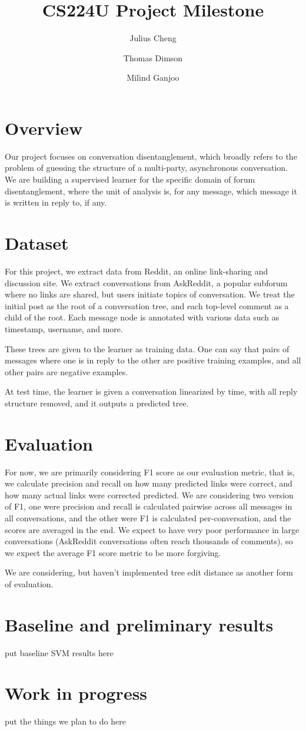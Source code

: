 \documentclass{article}
\title{CS224U Project Milestone}
\author{
Julius Cheng \and
Thomas Dimson \and
Milind Ganjoo
}
\begin{document}
\maketitle

\section*{Overview}

Our project focuses on conversation disentanglement, which broadly refers to
the problem of guessing the structure of a multi-party, asynchronous
conversation. We are building a supervised learner for the specific domain
of forum disentanglement, where the unit of analysis is, for any message, which
message it is written in reply to, if any.

\section*{Dataset}

For this project, we extract data from Reddit, an online link-sharing and
discussion site. We extract conversations from AskReddit, a popular subforum
where no links are shared, but users initiate topics of conversation. We treat
the initial post as the root of a conversation tree, and each top-level comment
as a child of the root. Each message node is annotated with various data such
as timestamp, username, and more.

These trees are given to the learner as training data. One can say that
pairs of messages where one is in reply to the other are positive training
examples, and all other pairs are negative examples.

At test time, the learner is given a conversation linearized by time, with all
reply structure removed, and it outputs a predicted tree.

\section*{Evaluation}

For now, we are primarily considering F1 score as our evaluation metric, that
is, we calculate precision and recall on how many predicted links were correct,
and how many actual links were corrected predicted. We are considering two
version of F1, one were precision and recall is calculated pairwise across all
messages in all conversations, and the other were F1 is calculated
per-conversation, and the scores are averaged in the end. We expect to have
very poor performance in large conversations (AskReddit conversations often
reach thousands of comments), so we expect the average F1 score metric to be
more forgiving.

We are considering, but haven't implemented tree edit distance as another form
of evaluation.

\section*{Baseline and preliminary results}

{put baseline SVM results here}

\section*{Work in progress}

{put the things we plan to do here}

{} 

\end{document}
